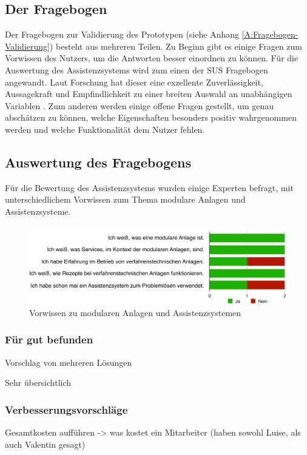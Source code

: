 \subsection{Der Fragebogen}
Der Fragebogen zur Validierung des Prototypen (siehe Anhang \ref{A:Fragebogen-Validierung}) besteht aus mehreren Teilen. Zu Beginn gibt es einige Fragen zum Vorwissen des Nutzers, um die Antworten besser einordnen zu können. Für die Auswertung des Assistenzsystems wird zum einen der SUS Fragebogen angewandt. Laut Forschung hat dieser eine \glqq exzellente Zuverlässigkeit, Aussagekraft und Empfindlichkeit zu einer breiten Auswahl an unabhängigen Variablen\grqq \cite[1150]{} . Zum anderen werden einige offene Fragen gestellt, um genau abschätzen zu können, welche Eigenschaften besonders positiv wahrgenommen werden und welche Funktionalität dem Nutzer fehlen. 

\subsection{Auswertung des Fragebogens}
Für die Bewertung des Assistenzsystems wurden einige Experten befragt, mit unterschiedlichem Vorwissen zum Thema modulare Anlagen und Assistenzsysteme. 
\begin{figure}[htbp]
\centering
\includegraphics[scale=0.65]{DA_files/Bilder/Validierung/Bild-Vorwissen.pdf}
\caption{Vorwissen zu modularen Anlagen und Assistenzsystemen}
\label{pic:Fragebogen-Vorwissen}
\end{figure}

\begin{figure}[htbp]
\centering

\end{figure}

\subsubsection*{Für gut befunden}
Vorschlag von mehreren Lösungen

Sehr übersichtlich

\subsubsection*{Verbesserungsvorschläge}
Gesamtkosten aufführen -> was kostet ein Mitarbeiter (haben sowohl Luise, als auch Valentin gesagt)

